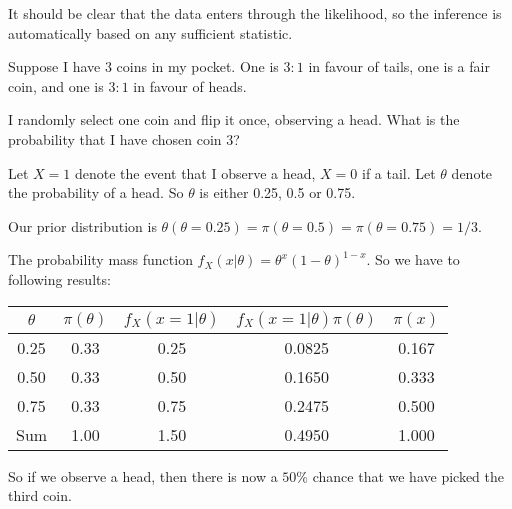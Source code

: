 \documentclass[a4paper]{article}
\begin{document}
It should be clear that the data enters through the likelihood, so the inference is automatically based on any sufficient statistic.

\begin{eg}
  Suppose I have $3$ coins in my pocket. One is $3:1$ in favour of tails, one is a fair coin, and one is $3:1$ in favour of heads.

  I randomly select one coin and flip it once, observing a head. What is the probability that I have chosen coin 3?

  Let $X = 1$ denote the event that I observe a head, $X = 0$ if a tail. Let $\theta$ denote the probability of a head. So $\theta$ is either 0.25, 0.5 or 0.75.

  Our prior distribution is $\theta(\theta = 0.25) = \pi(\theta = 0.5) = \pi(\theta = 0.75) = 1/3$.

  The probability mass function $f_X(x|\theta) = \theta^x(1 - \theta)^{1 - x}$. So we have to following results:
  \begin{center}
    \begin{tabular}{ccccc}
      \toprule
      $\theta$ & $\pi(\theta)$ & $f_X(x = 1|\theta)$ & $f_X(x = 1|\theta)\pi(\theta)$ & $\pi(x)$\\
      \midrule
      0.25 & 0.33 & 0.25 & 0.0825 & 0.167\\
      0.50 & 0.33 & 0.50 & 0.1650 & 0.333\\
      0.75 & 0.33 & 0.75 & 0.2475 & 0.500\\
      \midrule
      Sum & 1.00 & 1.50 & 0.4950 & 1.000\\
      \bottomrule
    \end{tabular}
  \end{center}
  So if we observe a head, then there is now a $50\%$ chance that we have picked the third coin.
\end{eg}
\end{document}
